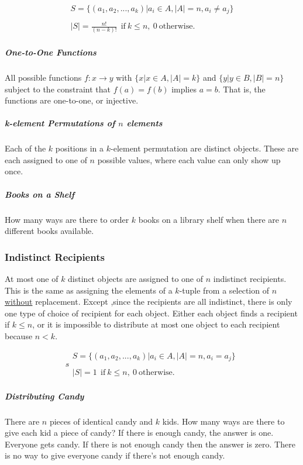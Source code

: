 \begin{equation}	
\begin{array}{l}
S = \{ (a_1,a_2,...,a_k) | a_i \in A, |A| = n, a_i\neq a_j\}\\
\\
|S| = \frac{n!}{(n-k)!}\ \ \mathrm{if\ }k\leq n,\ 0\ \mathrm{otherwise.}
\end{array}
\end{equation}

\subparagraph{One-to-One Functions} All possible functions $f:x \rightarrow y$ with $\{x | x\in A, |A| = k \}$ and $\{y | y\in B, |B| = n\}$ subject to the constraint that $f(a) = f(b)$ implies $a=b$. That is, the functions are one-to-one, or injective.

\subparagraph{k-element Permutations of $n$ elements}  Each of the $k$ positions in a $k$-element permutation are distinct objects. These are each assigned to one of $n$ possible values, where each value can only show up once. 

\subparagraph{Books on a Shelf} How many ways are there to order $k$ books on a library shelf when there are $n$ different books available. 

\subsubsection{Indistinct Recipients}
At most one of $k$ distinct objects are assigned to one of $n$ indistinct recipients. This is the same as assigning the elements of a $k$-tuple from a selection of $n$ \underline{without} replacement. Except ,since the recipients are all indistinct, there is only one type of choice of recipient for each object. Either each object finds a recipient if $k\leq n$, or it is impossible to distribute at most one object to each recipient because $n < k$.

\begin{equation}	s
\begin{array}{l}
S = \{ (a_1,a_2,...,a_k) | a_i \in A, |A| = n, a_i=a_j\}\\
\\
|S| = 1\ \ \mathrm{if\ }k\leq n,\ 0\ \mathrm{otherwise.}
\end{array}
\end{equation}

\subparagraph{Distributing Candy} There are $n$ pieces of identical candy and $k$ kids. How many ways are there to give each kid a piece of candy? If there is enough candy, the answer is one. Everyone gets candy. If there is not enough candy then the answer is zero. There is no way to give everyone candy if there's not enough candy.

